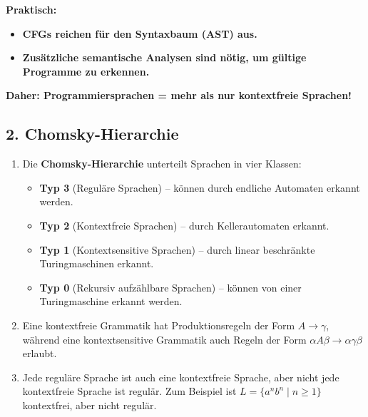 \documentclass[a4paper,12pt]{article}
\begin{document}
\begin{enumerate}
		\textbf{Praktisch:}
		\begin{itemize}
			\item \textbf{CFGs reichen für den Syntaxbaum (AST) aus.}
			\item \textbf{Zusätzliche semantische Analysen sind nötig, um gültige Programme zu erkennen.}
		\end{itemize}
		
		\textbf{Daher: Programmiersprachen = mehr als nur kontextfreie Sprachen!}	
	
	\end{enumerate}
	






		
	
	\subsection*{2. Chomsky-Hierarchie}
	\begin{enumerate}
		\item Die \textbf{Chomsky-Hierarchie} unterteilt Sprachen in vier Klassen:
		\begin{itemize}
			\item \textbf{Typ 3} (Reguläre Sprachen) – können durch endliche Automaten erkannt werden.
			\item \textbf{Typ 2} (Kontextfreie Sprachen) – durch Kellerautomaten erkannt.
			\item \textbf{Typ 1} (Kontextsensitive Sprachen) – durch linear beschränkte Turingmaschinen erkannt.
			\item \textbf{Typ 0} (Rekursiv aufzählbare Sprachen) – können von einer Turingmaschine erkannt werden.
		\end{itemize}
		
		\item Eine kontextfreie Grammatik hat Produktionsregeln der Form $A \rightarrow \gamma$, während eine kontextsensitive Grammatik auch Regeln der Form $\alpha A \beta \rightarrow \alpha \gamma \beta$ erlaubt.
		
		\item Jede reguläre Sprache ist auch eine kontextfreie Sprache, aber nicht jede kontextfreie Sprache ist regulär. Zum Beispiel ist $L = \{a^n b^n \mid n \geq 1\}$ kontextfrei, aber nicht regulär.
	\end{enumerate}
	
\end{document}
